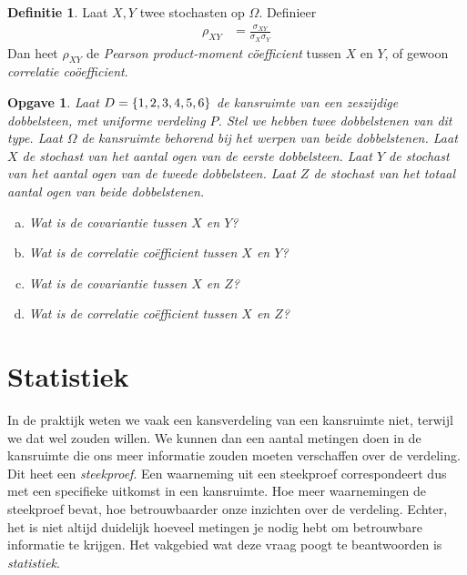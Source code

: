 \documentclass[a4paper]{book}
\newtheorem{exercise}[theorem]{Opgave}
\theoremstyle{definition}
\newtheorem{definition}[theorem]{Definitie}
\begin{document}
\begin{definition}
    Laat $X,Y$ twee stochasten op $\Omega$.
    Definieer
    \begin{align*}
        \rho_{XY} &= \frac{\sigma_{XY}}{\sigma_X \sigma_Y}
    \end{align*}
    Dan heet $\rho_{XY}$ de \emph{Pearson product-moment c\"oefficient} tussen $X$ en $Y$, of gewoon \emph{correlatie co\"oefficient}.
\end{definition}

\begin{exercise}
    Laat $D = \set{1,2,3,4,5,6}$ de kansruimte van een zeszijdige dobbelsteen, met uniforme verdeling $P$.
    Stel we hebben twee dobbelstenen van dit type. Laat $\Omega$ de kansruimte behorend bij het werpen van beide dobbelstenen.
    Laat $X$ de stochast van het aantal ogen van de eerste dobbelsteen.
    Laat $Y$ de stochast van het aantal ogen van de tweede dobbelsteen.
    Laat $Z$ de stochast van het totaal aantal ogen van beide dobbelstenen.
    \begin{enumerate}[a.]
    \item Wat is de covariantie tussen $X$ en $Y$?
    \item Wat is de correlatie co\"efficient tussen $X$ en $Y$?
    \item Wat is de covariantie tussen $X$ en $Z$?
    \item Wat is de correlatie co\"efficient tussen $X$ en $Z$?
    \end{enumerate}
\end{exercise}


\chapter{Statistiek}

In de praktijk weten we vaak een kansverdeling van een kansruimte niet, terwijl we dat wel zouden willen.
We kunnen dan een aantal metingen doen in de kansruimte die ons meer informatie zouden moeten verschaffen over de verdeling.
Dit heet een \emph{steekproef}.
Een waarneming uit een steekproef correspondeert dus met een specifieke uitkomst in een kansruimte.
Hoe meer waarnemingen de steekproef bevat, hoe betrouwbaarder onze inzichten over de verdeling.
Echter, het is niet altijd duidelijk hoeveel metingen je nodig hebt om betrouwbare informatie te krijgen.
Het vakgebied wat deze vraag poogt te beantwoorden is \emph{statistiek}.
\end{document}
